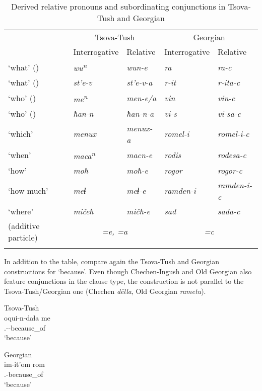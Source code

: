 \begin{table}
	\begin{tabular}{lllll}
    \lsptoprule
		&  \multicolumn{2}{c}{{Tsova-Tush}} & \multicolumn{2}{c}{{Georgian}}\\\cmidrule(lr){2-3}\cmidrule(lr){4-5}
		&  {Interrogative} & {Relative} & {Interrogative} & {Relative} \\
		\midrule
		‘what’ ({\Nom}) & \textit{wu\textsuperscript{n}} & \textit{wun-e} & \textit{ra} & \textit{ra-c} \\
		‘what’ ({\Ins}) & \textit{st'e-v} & \textit{st'e-v-a} & \textit{r-it} & \textit{r-ita-c} \\
		‘who’ ({\Nom}) & \textit{me\textsuperscript{n}} & \textit{men-e/a} & \textit{vin} & \textit{vin-c} \\
		‘who’ ({\Dat}) & \textit{ħan-n} & \textit{ħan-n-a} & \textit{vi-s} & \textit{vi-sa-c} \\
		‘which’ & \textit{menux} & \textit{menux-a} & \textit{romel-i} & \textit{romel-i-c} \\
		‘when’ & \textit{maca\textsuperscript{n}} & \textit{macn-e} & \textit{rodis} & \textit{rodesa-c} \\
		‘how’ & \textit{moħ} & \textit{moħ-e} & \textit{rogor} & \textit{rogor-c} \\
		‘how much’ & \textit{meɬ} & \textit{meɬ-e} & \textit{ramden-i} & \textit{ramden-i-c} \\
		‘where’ & \textit{mičeħ} & \textit{mičħ-e} & \textit{sad} & \textit{sada-c} \\
		\midrule
		(additive particle) & \multicolumn{2}{c}{\textit{=e, =a}} & \multicolumn{2}{c}{\textit{=c}}\\
        \lspbottomrule
	\end{tabular}
	\caption{Derived relative pronouns and subordinating conjunctions in Tsova-Tush and Georgian}
	\label{adjunct-table2}
\end{table}

In addition to the table, compare again the Tsova-Tush and Georgian constructions for ‘because’. Even though Chechen-Ingush and Old Georgian also feature conjunctions in the clause type, the construction is not parallel to the Tsova\hyp Tush\slash Georgian one (Chechen \textit{d\={e}lla}, Old Georgian \textit{rametu}).

\ea 
\begin{minipage}[t]{.5\linewidth}
	Tsova-Tush\\
	\gll oqui-n-daɬa me\\
		 \Dist.{\Obl}-{\Dat}-because\_of {\Subord}\\
	\glt ‘because’
\end{minipage}%
\begin{minipage}[t]{.5\linewidth}
	Georgian\\
	\gll im-it'om rom\\
		 \Dist.{\Obl}-because\_of {\Subord}\\
	\glt ‘because’
 \end{minipage}
\z

